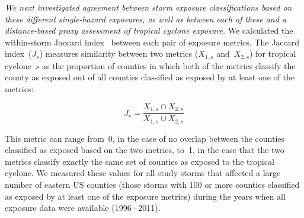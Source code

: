 \textit{We next investigated agreement between storm exposure
classifications based on these different single-hazard exposures, as well as
between each of these and a distance-based proxy assessment of tropical cyclone
exposure.} We calculated the within-storm
Jaccard index~\parencite{jaccard1901distribution, jaccard1908nouvelles} between
each pair of exposure metrics. The Jaccard index~($J_s$) measures similarity
between two metrics ($X_{1,s}$ and~$X_{2,s}$) for tropical cyclone~$s$ as the
proportion of counties in which both of the metrics classify the county as
exposed out of all counties classified as exposed by at least one of the
metrics:

\begin{equation} 
J_s = \frac{X_{1,s} \cap X_{2,s}}{X_{1,s} \cup X_{2,s}}
\end{equation}

\noindent This metric can range from~0, in the case of no overlap between the
counties classified as exposed based on the two metrics, to~1, in the case that
the two metrics classify exactly the same set of counties as exposed to the
tropical cyclone. We measured these values for all study storms that affected a
large number of eastern \ac{US} counties (those storms with 100 or more
counties classified as exposed by at least one of the exposure metrics)
during the years when all exposure data were available (1996\,--\,2011).



